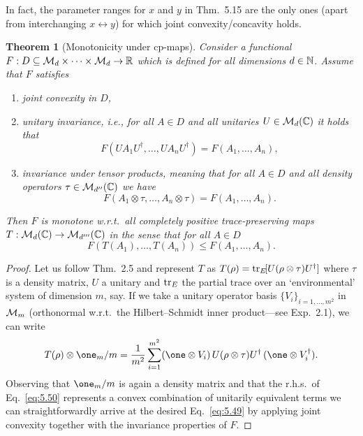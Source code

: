 \documentclass[11pt,a4paper]{article}
\theoremstyle{plain}
\newtheorem{theorem}{Theorem}[section]
\theoremstyle{definition}
\theoremstyle{remark}
\numberwithin{equation}{section}
\begin{document}
In fact, the parameter ranges for $x$ and $y$ in Thm.~5.15 are the only ones (apart
from interchanging $x\leftrightarrow y$) for which joint convexity/concavity holds.

\begin{theorem}[Monotonicity under cp-maps]
    Consider a functional $F:D\subseteq \mathcal{M}_d\times \cdots \times \mathcal{M}_d\to \mathbb{R}$ which is
    defined for all dimensions $d\in \mathbb{N}$. Assume that $F$ satisfies
    \begin{enumerate}
        \item joint convexity in $D$,
        \item unitary invariance, i.e., for all $A\in D$ and all unitaries $U\in \mathcal{M}_d(\mathbb{C})$
              it holds that
              \[
                  F(UA_1U^\dagger,\dots,UA_nU^\dagger)=F(A_1,\dots,A_n),
              \]
        \item invariance under tensor products, meaning that for all $A\in D$ and all density
              operators $\tau\in \mathcal{M}_{d''}(\mathbb{C})$ we have
              \[
                  F(A_1\otimes \tau,\dots,A_n\otimes \tau)=F(A_1,\dots,A_n).
              \]
    \end{enumerate}
    Then $F$ is monotone w.r.t.\ all completely positive trace-preserving maps
    $T:\mathcal{M}_d(\mathbb{C})\to \mathcal{M}_{d'''}(\mathbb{C})$ in the sense that for all $A\in D$
    \begin{equation}\label{eq:5.49}
        F(T(A_1),\dots,T(A_n)) \le F(A_1,\dots,A_n).
    \end{equation}
\end{theorem}

\begin{proof}
    Let us follow Thm.~2.5 and represent $T$ as
    $T(\rho)=\operatorname{tr}_E\![U(\rho\otimes \tau)U^\dagger]$ where $\tau$ is a density
    matrix, $U$ a unitary and $\operatorname{tr}_E$ the partial trace over an `environmental' system of
    dimension $m$, say. If we take a unitary operator basis $\{V_i\}_{i=1,\dots,m^2}$ in
    $\mathcal{M}_m$ (orthonormal w.r.t.\ the Hilbert--Schmidt inner product---see Exp.~2.1), we
    can write
    \begin{equation}\label{eq:5.50}
        T(\rho)\otimes \one_m/m
        =
        \frac{1}{m^2}\sum_{i=1}^{m^2}
        (\one \otimes V_i)\,U(\rho\otimes \tau)U^\dagger\,(\one\otimes V_i^\dagger).
    \end{equation}
    Observing that $\one_m/m$ is again a density matrix and that the r.h.s.\ of
    Eq.~\eqref{eq:5.50} represents a convex combination of unitarily equivalent terms we
    can straightforwardly arrive at the desired Eq.~\eqref{eq:5.49} by applying joint
    convexity together with the invariance properties of $F$.
\end{proof}
\end{document}
